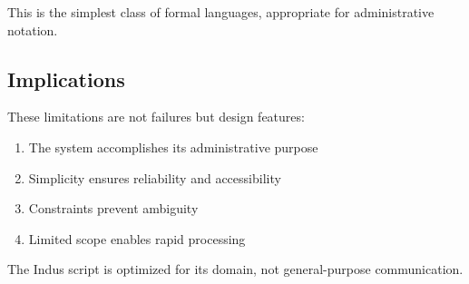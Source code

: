 This is the simplest class of formal languages, appropriate for administrative notation.

\subsection{Implications}

These limitations are not failures but design features:
\begin{enumerate}
    \item The system accomplishes its administrative purpose
    \item Simplicity ensures reliability and accessibility
    \item Constraints prevent ambiguity
    \item Limited scope enables rapid processing
\end{enumerate}

The Indus script is optimized for its domain, not general-purpose communication.
